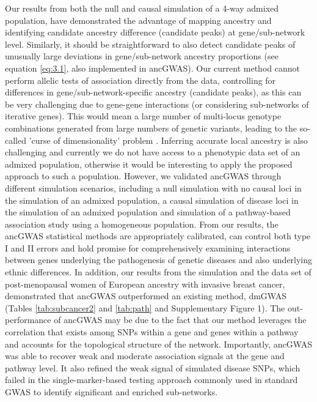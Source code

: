 \documentclass[10pt]{article}
\begin{document}
Our results from both the null and causal simulation of a 4-way admixed population, have demonstrated the advantage of mapping ancestry and identifying candidate ancestry difference (candidate peaks) at gene/sub-network level. Similarly, it should be straightforward to also detect candidate peaks of unusually large deviations in gene/sub-network ancestry proportions (see equation \ref{eq:3.1}, also implemented in ancGWAS). Our current method cannot perform allelic tests of association directly from the data, controlling for differences in gene/sub-network-specific ancestry (candidate peaks), as this can be very challenging due to gene-gene interactions (or considering sub-networks of iterative genes). This would mean a large number of multi-locus genotype combinations generated from large numbers of genetic variants, leading to the so-called 'curse of dimensionality' problem \cite{bellm}. Inferring accurate local ancestry is also challenging \cite{gala,chims} and currently we do not have access to a phenotypic data set of an admixed population, otherwise it would be interesting to apply the proposed approach to such a population. However, we validated ancGWAS through different simulation scenarios, including a null simulation with no causal loci in the simulation of an admixed population, a causal simulation of disease loci in the simulation of an admixed population and simulation of a pathway-based association study using a homogeneous population. From our results, the ancGWAS statistical methods are appropriately calibrated, can control both type I and II errors and hold promise for comprehensively examining interactions between genes underlying the pathogenesis of genetic diseases and also underlying ethnic differences. In addition, our results from the simulation and the data set of post-menopausal women of European ancestry with invasive breast cancer, demonstrated that ancGWAS outperformed an existing method, dmGWAS (Tables \ref{tab:subcancer2} and \ref{tab:path} and Supplementary Figure 1). The out-performance of ancGWAS may be due to the fact that our method leverages the correlation that exists among SNPs within a gene and genes within a pathway and accounts for the topological structure of the network. Importantly, ancGWAS was able to recover weak and moderate association signals at the gene and pathway level. It also refined the weak signal of simulated disease SNPs, which failed in the single-marker-based testing approach commonly used in standard GWAS to identify significant and enriched sub-networks. 
\end{document}
